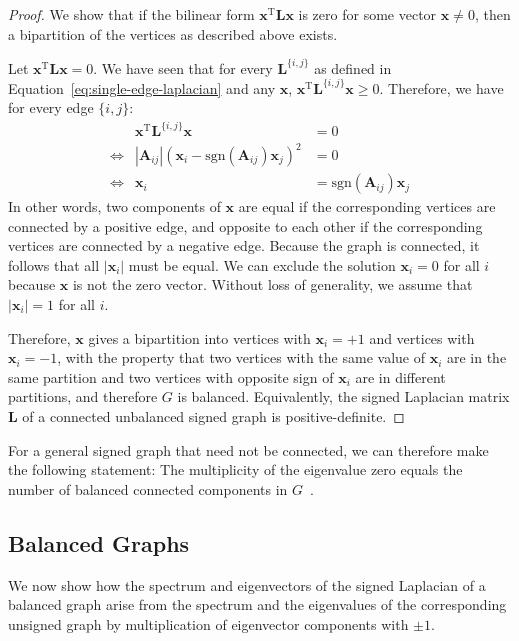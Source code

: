\documentclass[11pt,a4paper]{book}
\begin{document}
\begin{proof}
  We show that if the bilinear form $\mathbf x^{\mathrm T} \mathbf L
  \mathbf x$ is zero for some vector $\mathbf x \neq 0$, then a 
  bipartition of the vertices as described above exists.

  Let $\mathbf x^{\mathrm T} \mathbf L \mathbf x = 0$.  
  We have seen that for every $\mathbf L^{\{i,j\}}$ as defined in
  Equation~\ref{eq:single-edge-laplacian} and any $\mathbf   
  x$, $\mathbf x^{\mathrm T} \mathbf L^{\{i,j\}} \mathbf x \geq 0$.
  Therefore, we have for every edge $\{i,j\}$:
  \begin{align*}
    && \mathbf x^{\mathrm T} \mathbf L^{\{i,j\}} \mathbf x &= 0 \\
    &\Leftrightarrow& |\mathbf A_{ij}| (\mathbf x_i -\mathrm{sgn}(\mathbf
    A_{ij})\mathbf x_j)^2 &= 0 & \\
    &\Leftrightarrow& \mathbf x_i &= \mathrm{sgn}(\mathbf A_{ij})\mathbf x_j &
  \end{align*}
  In other words, two components of $\mathbf x$ are equal if the corresponding
  vertices are connected by a positive edge, and opposite to each other if
  the corresponding vertices are connected by a negative edge.  
  Because the graph is connected, it follows that all $|\mathbf x_i|$ must be
  equal.  
  We can exclude the solution $\mathbf x_i = 0$ for all $i$ because
  $\mathbf x$ is not
  the zero vector.
  Without loss of generality, we assume that $|\mathbf x_i|=1$ for all $i$. 

  Therefore, $\mathbf x$ gives a bipartition into vertices with $\mathbf x_i = +1$ and
  vertices with $\mathbf x_i = -1$, with the property that two vertices with the
  same value of $\mathbf x_i$ are in the same partition and two vertices with
  opposite sign of $\mathbf x_i$ are in different partitions, and therefore $G$ is
  balanced. 
  Equivalently, the signed Laplacian matrix $\mathbf L$ of a 
  connected unbalanced signed graph is positive-definite. 
\end{proof}

For a general signed graph that need not be connected, we can therefore make
the following statement:  The multiplicity of the eigenvalue zero equals
the number of balanced connected components in $G$~\cite{b651}.  

\subsection{Balanced Graphs}
We now show how the spectrum and eigenvectors of the signed Laplacian of
a balanced graph arise from the spectrum and the eigenvalues of the
corresponding unsigned graph by multiplication of eigenvector
components with $\pm 1$. 
\end{document}

